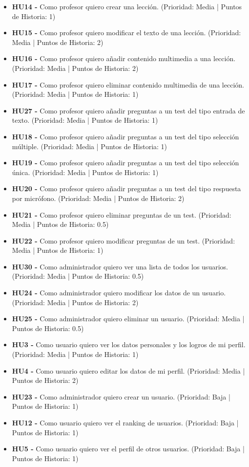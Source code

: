 \begin{itemize}
    \item \textbf{HU14 - } Como profesor quiero crear una lección. (Prioridad: Media | Puntos de Historia: 1)
    \item \textbf{HU15 - } Como profesor quiero modificar el texto de una lección. (Prioridad: Media | Puntos de Historia: 2)
    \item \textbf{HU16 - } Como profesor quiero añadir contenido multimedia a una lección. (Prioridad: Media | Puntos de Historia: 2)
    \item \textbf{HU17 - } Como profesor quiero eliminar contenido multimedia de una lección. (Prioridad: Media | Puntos de Historia: 1)
    \item \textbf{HU27 - } Como profesor quiero añadir preguntas a un test del tipo entrada de texto. (Prioridad: Media | Puntos de Historia: 1)
    \item \textbf{HU18 - } Como profesor quiero añadir preguntas a un test del tipo selección múltiple. (Prioridad: Media | Puntos de Historia: 1)
    \item \textbf{HU19 - } Como profesor quiero añadir preguntas a un test del tipo selección única. (Prioridad: Media | Puntos de Historia: 1)
    \item \textbf{HU20 - } Como profesor quiero añadir preguntas a un test del tipo respuesta por micrófono. (Prioridad: Media | Puntos de Historia: 2)
    \item \textbf{HU21 - } Como profesor quiero eliminar preguntas de un test. (Prioridad: Media | Puntos de Historia: 0.5)
    \item \textbf{HU22 - } Como profesor quiero modificar preguntas de un test. (Prioridad: Media | Puntos de Historia: 1)
    \item \textbf{HU30 - } Como administrador quiero ver una lista de todos los usuarios. (Prioridad: Media | Puntos de Historia: 0.5)
    \item \textbf{HU24 - } Como administrador quiero modificar los datos de un usuario. (Prioridad: Media | Puntos de Historia: 2)
    \item \textbf{HU25 - } Como administrador quiero eliminar un usuario. (Prioridad: Media | Puntos de Historia: 0.5)
    \item \textbf{HU3 - } Como usuario quiero ver los datos personales y los logros de mi perfil. (Prioridad: Media | Puntos de Historia: 1)
    \item \textbf{HU4 - } Como usuario quiero editar los datos de mi perfil. (Prioridad: Media | Puntos de Historia: 2)
    \item \textbf{HU23 - } Como administrador quiero crear un usuario. (Prioridad: Baja | Puntos de Historia: 1)
    \item \textbf{HU12 - } Como usuario quiero ver el ranking de usuarios. (Prioridad: Baja | Puntos de Historia: 1)
    \item \textbf{HU5 - } Como usuario quiero ver el perfil de otros usuarios.  (Prioridad: Baja | Puntos de Historia: 1)

\end{itemize}

